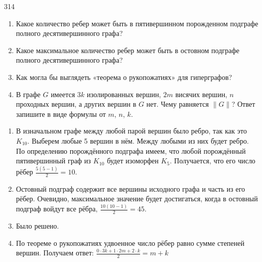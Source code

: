 \begin{task}{314}
\begin{enumerate}
\item Какое количество ребер может быть в пятивершинном порожденном подграфе полного десятивершинного графа?
\item Какое максимальное количество ребер может быть в остовном подграфе полного десятивершинного графа?
\item Как могла бы выглядеть «теорема о рукопожатиях» для гиперграфов?
\item В графе $G$ имеется $3k$ изолированных вершин, $2m$ висячих вершин, $n$ проходных вершин, а других вершин в $G$ нет. Чему равняется $\|G\|$? Ответ запишите в виде формулы от $m$, $n$, $k$.
\end{enumerate}
\end{task}

\begin{solution}
\begin{enumerate}
\item В изначальном графе между любой парой вершин было ребро, так как это $K_{10}$. Выберем любые 5 вершин в нём. Между любыми из них будет ребро. По определению порождённого подграфа имеем, что любой порождённый пятивершинный граф из $K_{10}$ будет изоморфен $K_5$. Получается, что его число рёбер $\frac{5(5-1)}{2}=10$.
\item Остовный подграф содержит все вершины исходного графа и часть из его рёбер. Очевидно, максимальное значение будет достигаться, когда в остовный подграф войдут все рёбра, $\frac{10(10-1)}{2}=45$.
\item Было решено.
\item По теореме о рукопожатиях удвоенное число рёбер равно сумме степеней вершин. Получаем ответ: $\frac{0 \cdot 3k+1 \cdot 2m+2 \cdot k}{2}=m+k$
\end{enumerate}
\end{solution}